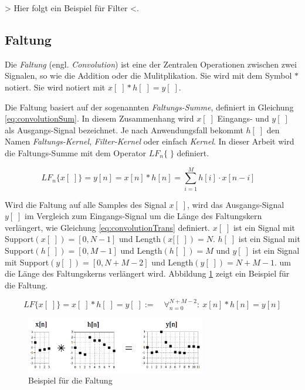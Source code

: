 > Hier folgt ein Beispiel für Filter <.

\subsection{Faltung}

Die \emph{Faltung} (engl. \emph{Convolution}) ist eine der Zentralen Operationen zwischen zwei Signalen, so wie die Addition oder die Mulitplikation. Sie wird mit dem Symbol $*$ notiert. Sie wird notiert mit $x[\;]* h[\;] = y[\;]$. 

Die Faltung basiert auf der sogenannten \emph{Faltungs-Summe}, definiert in Gleichung \ref{eq:convolutionSum}. In diesem Zusammenhang wird $x[\;]$ Eingangs- und $y[\;]$ als Ausgangs-Signal bezeichnet. Je nach Anwendungsfall bekommt $h[\;]$ den Namen \emph{Faltungs-Kernel}, \emph{Filter-Kernel} oder einfach \emph{Kernel}. In dieser Arbeit wird die Faltungs-Summe mit dem Operator $LF_n\{\;\}$ definiert. \cite[S. 107-108]{dspGuide}

\begin{equation}
LF_n\{x[\;]\} = y[n] = x[n] * h[n] = \sum_{i=1}^{M} h[i] \cdot x[n-i] \quad
\label{eq:convolutionSum}
\end{equation}

Wird die Faltung auf alle Samples des Signal $x[\;]$, wird das Ausgangs-Signal $y[\;]$ im Vergleich zum Eingangs-Signal um die Länge des Faltungskern verlängert, wie Gleichung \ref{eq:convolutionTrans} definiert. $x[\;]$ ist ein Signal mit Support$(x[\;]) = [0,N-1]$ und Length$(x[[\;]) = N$. $h[\;]$ ist ein Signal mit Support$(h[\;]) = [0,M-1]$ und Length$(h[\;]) = M$ und $y[\;]$ ist ein Signal mit Support$(y[\;]) = [0,N+M-2]$ und Length$(y[\;]) = N+M-1$.  um die Länge des Faltungskerns verlängert wird. Abbildung 	\ref{img:convolutionExample} zeigt ein Beispiel für die Faltung.\cite[S. 115-120]{dspGuide}

\begin{equation}
LF\{x[\;]\} = x[\;] *  h[\;] =  y[\;] := \quad \mathop{\forall}_{n = 0}^{N+M-2} :\ x[n] * h[n] = y[n]
\label{eq:convolutionTrans}
\end{equation}

\begin{figure}[h]
	\centering
	\includegraphics[width=0.7\textwidth]{bilder/convolutionExample.png}
	\caption{Beispiel für die Faltung}
	\label{img:convolutionExample}
\end{figure}

